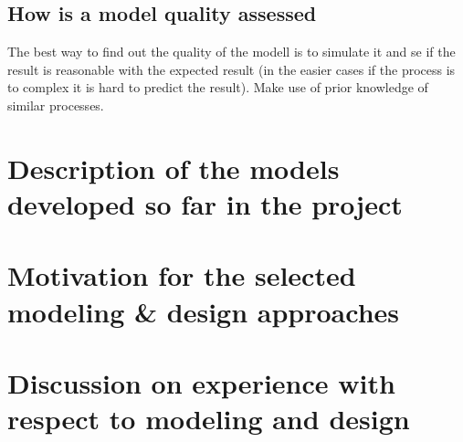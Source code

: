\documentclass{article}
\begin{document}
\subsection{How is a model quality assessed}

The best way to find out the quality of the modell is to simulate it and se if the result is reasonable with the expected result (in the easier cases if the process is to complex it is hard to predict the result). Make use of prior knowledge of similar processes.    


\section{Description of the models developed so far in the project }




\section{Motivation for the selected modeling \& design approaches}


\section{Discussion on experience with respect to modeling and design}
\end{document}
